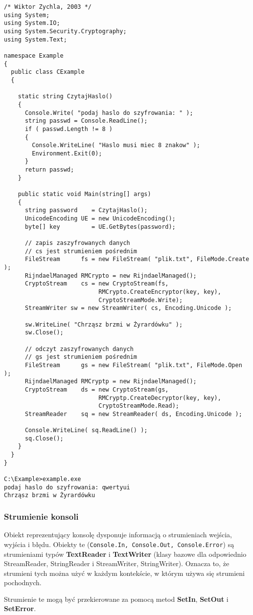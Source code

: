 \begin{scriptsize}
\begin{verbatim}
/* Wiktor Zychla, 2003 */
using System;
using System.IO;
using System.Security.Cryptography; 
using System.Text;

namespace Example
{
  public class CExample 
  {

    static string CzytajHaslo()
    {
      Console.Write( "podaj haslo do szyfrowania: " );
      string passwd = Console.ReadLine();  
      if ( passwd.Length != 8 ) 
      {
        Console.WriteLine( "Haslo musi miec 8 znakow" );
        Environment.Exit(0);
      }
      return passwd;
    }

    public static void Main(string[] args)
    {
      string password    = CzytajHaslo();       
      UnicodeEncoding UE = new UnicodeEncoding();
      byte[] key         = UE.GetBytes(password);

      // zapis zaszyfrowanych danych
      // cs jest strumieniem pośrednim
      FileStream      fs = new FileStream( "plik.txt", FileMode.Create );
      RijndaelManaged RMCrypto = new RijndaelManaged();
      CryptoStream    cs = new CryptoStream(fs,
                           RMCrypto.CreateEncryptor(key, key),   
                           CryptoStreamMode.Write);      
      StreamWriter sw = new StreamWriter( cs, Encoding.Unicode );  

      sw.WriteLine( "Chrząsz brzmi w Żyrardówku" );      
      sw.Close();

      // odczyt zaszyfrowanych danych
      // gs jest strumieniem pośrednim 
      FileStream      gs = new FileStream( "plik.txt", FileMode.Open );
      RijndaelManaged RMCryptp = new RijndaelManaged();
      CryptoStream    ds = new CryptoStream(gs,
                           RMCryptp.CreateDecryptor(key, key),   
                           CryptoStreamMode.Read);      
      StreamReader    sq = new StreamReader( ds, Encoding.Unicode );  
 
      Console.WriteLine( sq.ReadLine() );
      sq.Close(); 
    }
  }
}

C:\Example>example.exe
podaj haslo do szyfrowania: qwertyui
Chrząsz brzmi w Żyrardówku
\end{verbatim}
\end{scriptsize}

\subsubsection{Strumienie konsoli}

Obiekt reprezentujący konsolę dysponuje informacją o strumieniach wejścia, wyjścia i błędu. Obiekty te
({\tt Console.In, Console.Out, Console.Error}) są strumieniami typów {\bf TextReader} i
{\bf TextWriter} (klasy bazowe dla odpowiednio StreamReader, StringReader i StreamWriter, StringWriter).
Oznacza to, że strumieni tych można użyć w każdym kontekście, w którym używa się strumieni pochodnych.

Strumienie te mogą być przekierowane za pomocą metod {\bf SetIn}, {\bf SetOut} i {\bf SetError}.

